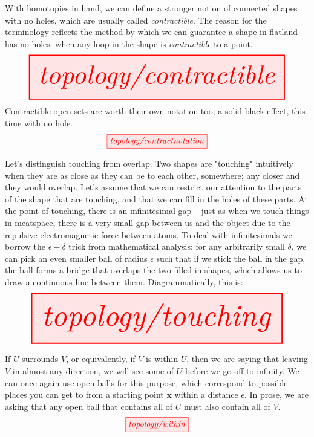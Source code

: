 \begin{myboxB}
\begin{defn}[Contractibility]\label{defn:contractible}
With homotopies in hand, we can define a stronger notion of connected shapes with no holes, which are usually called \emph{contractible}. The reason for the terminology reflects the method by which we can guarantee a shape in flatland has no holes: when any loop in the shape is \emph{contractible} to a point.
\[\resizebox{\textwidth}{!}{\tikzfig{topology/contractible}}\]
Contractible open sets are worth their own notation too; a solid black effect, this time with no hole.
\[\tikzfig{topology/contractnotation}\]
\end{defn}
\end{myboxB}

\begin{myboxR}
\begin{defn}[Touching]\label{defn:touching}
Let's distinguish touching from overlap. Two shapes are "touching" intuitively when they are as close as they can be to each other, somewhere; any closer and they would overlap. Let's assume that we can restrict our attention to the parts of the shape that are touching, and that we can fill in the holes of these parts. At the point of touching, there is an infinitesimal gap -- just as when we touch things in meatspace, there is a very small gap between us and the object due to the repulsive electromagnetic force between atoms. To deal with infinitesimals we borrow the $\epsilon-\delta$ trick from mathematical analysis; for any arbitrarily small $\delta$, we can pick an even smaller ball of radius $\epsilon$ such that if we stick the ball in the gap, the ball forms a bridge that overlaps the two filled-in shapes, which allows us to draw a continuous line between them. Diagrammatically, this is: 
\[\resizebox{\textwidth}{!}{\tikzfig{topology/touching}}\]
\end{defn}
\end{myboxR}

\begin{myboxB}
\begin{defn}\label{defn:within}
If $U$ surrounds $V$, or equivalently, if $V$ is within $U$, then we are saying that leaving $V$ in almost any direction, we will see some of $U$ before we go off to infinity. We can once again use open balls for this purpose, which correspond to possible places you can get to from a starting point $\mathbf{x}$ within a distance $\epsilon$. In prose, we are asking that any open ball that contains all of $U$ must also contain all of $V$.
\[\tikzfig{topology/within}\]
\end{defn}
\end{myboxB}

